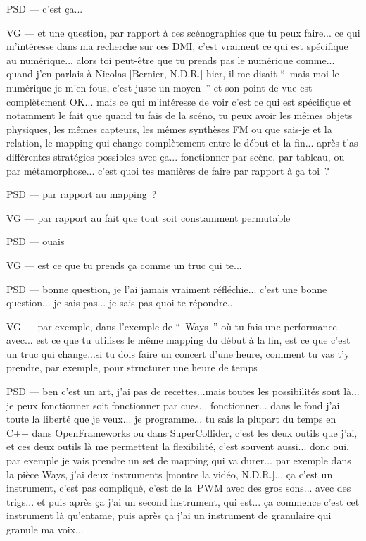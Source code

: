 PSD — c'est ça...

VG — et une question, par rapport à ces scénographies que tu peux faire... ce qui m'intéresse dans ma recherche sur ces DMI, c'est vraiment ce qui est spécifique au numérique... alors toi peut-être que tu prends pas le numérique comme... quand j'en parlais à Nicolas [Bernier, N.D.R.] hier, il me disait “ mais moi le numérique je m'en fous, c'est juste un moyen ” et son point de vue est complètement OK... mais ce qui m'intéresse de voir c'est ce qui est spécifique et notamment le fait que quand tu fais de la scéno, tu peux avoir les mêmes objets physiques, les mêmes capteurs, les mêmes synthèses FM ou que sais-je et la relation, le mapping qui change complètement entre le début et la fin... après t'as différentes stratégies possibles avec ça... fonctionner par scène, par tableau, ou par métamorphose... c'est quoi tes manières de faire par rapport à ça toi ?

PSD — par rapport au mapping ?

VG — par rapport au fait que tout soit constamment permutable

PSD — ouais

VG — est ce que tu prends ça comme un truc qui te...

PSD — bonne question, je l'ai jamais vraiment réfléchie... c'est une bonne question... je sais pas... je sais pas quoi te répondre...

VG — par exemple, dans l'exemple de “ Ways ” où tu fais une performance avec... est ce que tu utilises le même mapping du début à la fin, est ce que c'est un truc qui change...si tu dois faire un concert d'une heure, comment tu vas t'y prendre,  par exemple, pour structurer une heure de temps 

PSD — ben c'est un art, j'ai pas de recettes...mais toutes les possibilités sont là... je peux fonctionner soit fonctionner par cues... fonctionner... dans le fond j'ai toute la liberté que je veux... je programme... tu sais la plupart du temps en C++ dans OpenFrameworks ou dans SuperCollider, c'est les deux outils que j'ai, et ces deux outils là me permettent la flexibilité, c'est souvent aussi... donc oui, par exemple je vais prendre un set de mapping qui va durer... par exemple dans la pièce Ways, j'ai deux instruments [montre la vidéo, N.D.R.]... ça c'est un instrument, c'est pas compliqué, c'est de la PWM avec des gros sons... avec des trigs... et puis après ça j'ai un second instrument, qui est... ça commence c'est cet instrument là qu'entame, puis après ça j'ai un instrument de granulaire qui granule ma voix...

